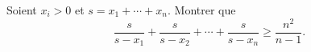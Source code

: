 Soient $x_i > 0$ et $s = x_1 + \cdots + x_n$. Montrer que
\[ \frac{s}{s - x_1} + \frac{s}{s - x_2} + \cdots + \frac{s}{s - x_n} \geq \frac{n^2}{n - 1}. \]
